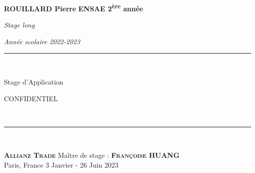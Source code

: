 \newcommand{\HRule}{\rule{\linewidth}{0.5mm}}

\begin{titlepage}
\begin{center}

\begin{minipage}{1\textwidth}
\Large{\textbf{ROUILLARD Pierre}} 
\hfill
\large{\textbf{ENSAE 2\textsuperscript{ère} année}}\par
\vspace{0cm}
\hfill \normalsize{\textit{Stage long}}\par
\hfill \normalsize{\textit{Année scolaire 2022-2023}}  
\end{minipage}

\vspace{8cm}



\begin{center}
\HRule \\[.5cm]
{\huge \bfseries{Stage d'Application\par CONFIDENTIEL}}\\[0.5cm]
\HRule \\[2.5cm]
\end{center}

\vfill

\begin{minipage}{1\textwidth}
\begin{flushleft}
\large{\textbf{\textsc{Allianz Trade}}} \hfill \small{Maître de stage :} \large{\textbf{\textsc{Françoise HUANG}}} \\ 
\small{Paris, France} \hfill \small{3 Janvier - 26 Juin 2023}
\end{flushleft}
\end{minipage}

\end{center}
\end{titlepage}